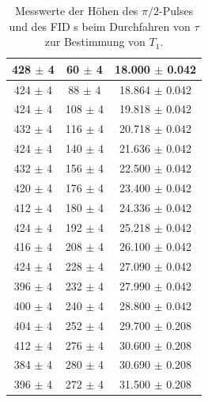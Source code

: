 \documentclass[12pt,a4paper]{article}
\begin{document}
\begin{table}
\begin{tabular}{|c|c|c|}
428 $\pm$ 4 & 60 $\pm$ 4 & 18.000 $\pm$ 0.042 \\ 
\hline 
424 $\pm$ 4 & 88 $\pm$ 4 & 18.864 $\pm$ 0.042 \\ 
\hline 
424 $\pm$ 4 & 108 $\pm$ 4 & 19.818 $\pm$ 0.042 \\ 
\hline 
432 $\pm$ 4 & 116 $\pm$ 4 & 20.718 $\pm$ 0.042 \\ 
\hline 
424 $\pm$ 4 & 140 $\pm$ 4 & 21.636 $\pm$ 0.042 \\ 
\hline 
432 $\pm$ 4 & 156 $\pm$ 4 & 22.500 $\pm$ 0.042 \\ 
\hline 
420 $\pm$ 4 & 176 $\pm$ 4 & 23.400 $\pm$ 0.042 \\ 
\hline 
412 $\pm$ 4 & 180 $\pm$ 4 & 24.336 $\pm$ 0.042 \\ 
\hline 
424 $\pm$ 4 & 192 $\pm$ 4 & 25.218 $\pm$ 0.042 \\ 
\hline 
416 $\pm$ 4 & 208 $\pm$ 4 & 26.100 $\pm$ 0.042 \\ 
\hline 
424 $\pm$ 4 & 228 $\pm$ 4 & 27.090 $\pm$ 0.042 \\ 
\hline 
396 $\pm$ 4 & 232 $\pm$ 4 & 27.990 $\pm$ 0.042 \\ 
\hline 
400 $\pm$ 4 & 240 $\pm$ 4 & 28.800 $\pm$ 0.042 \\ 
\hline 
404 $\pm$ 4 & 252 $\pm$ 4 & 29.700 $\pm$ 0.208 \\ 
\hline 
412 $\pm$ 4 & 276 $\pm$ 4 & 30.600 $\pm$ 0.208 \\ 
\hline 
384 $\pm$ 4 & 280 $\pm$ 4 & 30.690 $\pm$ 0.208 \\ 
\hline 
396 $\pm$ 4 & 272 $\pm$ 4 & 31.500 $\pm$ 0.208 \\ 
\hline 
\end{tabular} 
\caption{Messwerte der Höhen des $\pi /2$-Pulses und des FID s beim Durchfahren von $\tau$ zur Bestimmung von $T_1$.}
\label{tab:T1_Daten}
\end{table}
\end{document}
